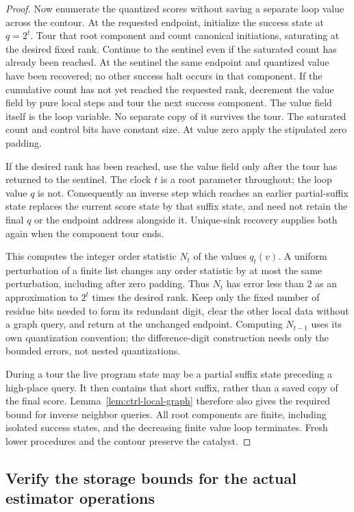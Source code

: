 \begin{proof}
Now enumerate the quantized scores without saving a separate loop value across the contour. At the requested endpoint, initialize the success state at $q=2^t$.
Tour that root component and count canonical
initiations, saturating at the desired fixed rank.  Continue to the
sentinel even if the saturated count has already been reached.  At the
sentinel the same endpoint and quantized value have been recovered; no
other success halt occurs in that component.  If the cumulative count
has not yet reached the requested rank, decrement the value field by
pure local steps and tour the next success component.  The value field
itself is the loop variable.  No separate copy of it survives the tour.
The saturated count and control bits have constant size.  At value zero
apply the stipulated zero padding.

If the desired rank has been reached, use the value field only after
the tour has returned to the sentinel.  The clock $t$ is a root
parameter throughout; the loop value $q$ is not.  Consequently an inverse
step which reaches an earlier partial-suffix state replaces the current
score state by that suffix state, and need not retain the final $q$ or
the endpoint address alongside it.  Unique-sink recovery supplies both
again when the component tour ends.

This computes the integer order statistic $N_t$ of the values $q_t(v)$.
A uniform
perturbation of a finite list changes any order statistic by at most
the same perturbation, including after zero padding.  Thus $N_t$ has
error less than $2$ as an approximation to $2^t$ times the desired rank.
Keep only the fixed number of residue bits needed to form its
redundant digit, clear the other local data without a graph query, and
return at the unchanged endpoint.  Computing $N_{t-1}$ uses its own
quantization convention; the difference-digit construction needs only
the bounded errors, not nested quantizations.

During a tour the live program state may be a partial suffix state
preceding a high-place query.  It then contains that short suffix,
rather than a saved copy of the final score.  Lemma~\ref{lem:ctrl-local-graph}
therefore also gives the required bound for inverse neighbor queries.
All root components are finite, including isolated success states, and
the decreasing finite value loop terminates.  Fresh lower procedures
and the contour preserve the catalyst.
\end{proof}

\subsection{Verify the storage bounds for the actual estimator operations}\label{sec:ctrl-recipes}

